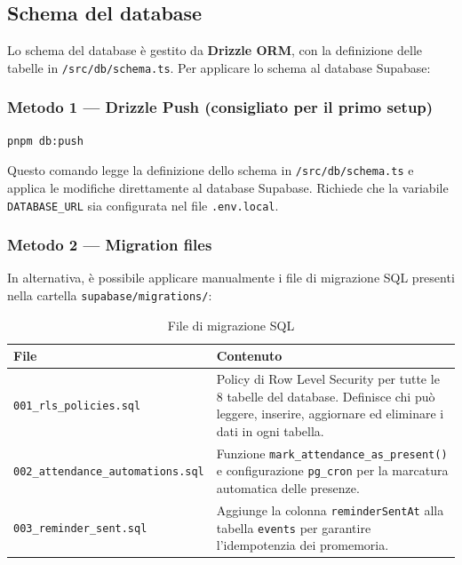 \documentclass[a4paper,11pt,oneside]{book}
\begin{document}
\subsection{Schema del database}
\label{sec:supabase-schema}

Lo schema del database \`e gestito da \textbf{Drizzle ORM}, con la definizione delle tabelle in \texttt{/src/db/schema.ts}. Per applicare lo schema al database Supabase:

\subsubsection{Metodo 1 --- Drizzle Push (consigliato per il primo setup)}

\begin{verbatim}
pnpm db:push
\end{verbatim}

Questo comando legge la definizione dello schema in \texttt{/src/db/schema.ts} e applica le modifiche direttamente al database Supabase. Richiede che la variabile \texttt{DATABASE\_URL} sia configurata nel file \texttt{.env.local}.

\subsubsection{Metodo 2 --- Migration files}

In alternativa, \`e possibile applicare manualmente i file di migrazione SQL presenti nella cartella \texttt{supabase/migrations/}:

\begin{table}[htbp]
\centering
\caption{File di migrazione SQL}
\label{tab:migration-files}
\begin{tabularx}{\textwidth}{l X}
\toprule
\textbf{File} & \textbf{Contenuto} \\
\midrule
\texttt{001\_rls\_policies.sql}         & Policy di Row Level Security per tutte le 8 tabelle del database. Definisce chi pu\`o leggere, inserire, aggiornare ed eliminare i dati in ogni tabella. \\
\texttt{002\_attendance\_automations.sql} & Funzione \texttt{mark\_attendance\_as\_present()} e configurazione \texttt{pg\_cron} per la marcatura automatica delle presenze. \\
\texttt{003\_reminder\_sent.sql}         & Aggiunge la colonna \texttt{reminderSentAt} alla tabella \texttt{events} per garantire l'idempotenzia dei promemoria. \\
\bottomrule
\end{tabularx}
\end{table}
\end{document}
